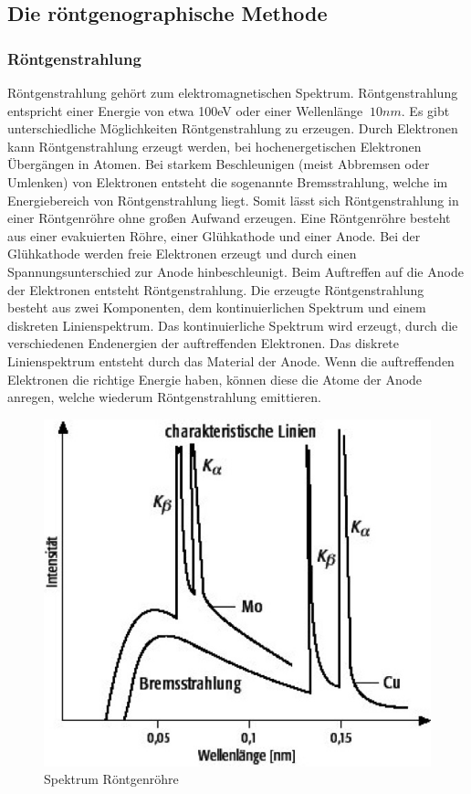     \subsection{Die röntgenographische Methode}

        \subsubsection{Röntgenstrahlung}    
            Röntgenstrahlung gehört zum elektromagnetischen Spektrum. Röntgenstrahlung entspricht einer Energie von etwa
            100eV oder einer Wellenlänge $~10 nm$. Es gibt unterschiedliche Möglichkeiten Röntgenstrahlung zu erzeugen. 
            Durch Elektronen kann Röntgenstrahlung erzeugt werden, bei hochenergetischen Elektronen Übergängen in Atomen. 
            Bei starkem Beschleunigen (meist Abbremsen oder Umlenken) von Elektronen entsteht die sogenannte Bremsstrahlung, welche im Energiebereich
            von Röntgenstrahlung liegt. Somit lässt sich Röntgenstrahlung in einer Röntgenröhre ohne großen Aufwand erzeugen.
            Eine Röntgenröhre besteht aus einer evakuierten Röhre, einer Glühkathode und einer Anode. Bei der Glühkathode werden
            freie Elektronen erzeugt und durch einen Spannungsunterschied zur Anode hinbeschleunigt. Beim Auftreffen auf die Anode
            der Elektronen entsteht Röntgenstrahlung. Die erzeugte Röntgenstrahlung besteht aus zwei Komponenten, dem kontinuierlichen Spektrum
            und einem diskreten Linienspektrum. Das kontinuierliche Spektrum wird erzeugt, durch die verschiedenen Endenergien der auftreffenden Elektronen. 
            Das diskrete Linienspektrum entsteht durch das Material der Anode. Wenn die auftreffenden Elektronen die richtige Energie haben, 
            können diese die Atome der Anode anregen, welche wiederum Röntgenstrahlung emittieren.
            \begin{figure}
                \centering
                \includegraphics{images/Spektrum_Röntgenröhre.jpg}
                \caption{Spektrum Röntgenröhre}
            \end{figure}

